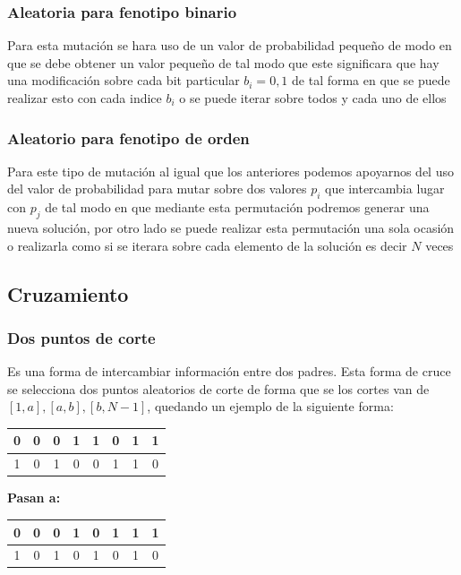 \documentclass[10pt]{article}
\begin{document}
\subsubsection{Aleatoria para fenotipo binario}
Para esta mutación se hara uso de un valor de probabilidad pequeño de modo en que se debe obtener un valor pequeño de tal modo que este significara que hay una modificación sobre cada bit particular $b_{i}={0,1}$ de tal forma en que se puede realizar esto con cada indice $b_{i}$ o se puede iterar sobre todos y cada uno de ellos
\subsubsection{Aleatorio para fenotipo de orden}
Para este tipo de mutación al igual que los anteriores podemos apoyarnos del uso del valor de probabilidad para mutar sobre dos valores $p_{i}$ que intercambia lugar con $p_{j}$ de tal modo en que mediante esta permutación podremos generar una nueva solución, por otro lado se puede realizar esta permutación una sola ocasión o realizarla como si se iterara sobre cada elemento de la solución es decir $N$ veces
\subsection{Cruzamiento}
\subsubsection{Dos puntos de corte}
Es una forma de intercambiar información entre dos padres. Esta forma de cruce se selecciona dos puntos aleatorios de corte de forma que se los cortes van de $[1,a],[a,b],[b,N-1]$, quedando un ejemplo de la siguiente forma:
\begin{center}
  \begin{tabular}{|c|c|c|c|c|c|c|c|}
    \hline
    \color{green}0&\color{green}0&\color{green}0&\color{green}1&\color{blue}1&\color{blue}0&\color{green}1&\color{green}1\\
    \hline
    \color{red}1&\color{red}0&\color{red}1&\color{red}0&\color{yellow}0&\color{yellow}1&\color{red}1&\color{red}0\\
    \hline
  \end{tabular}
  \textbf{Pasan a:}
  \begin{tabular}{|c|c|c|c|c|c|c|c|}
    \hline
    \color{green}0&\color{green}0&\color{green}0&\color{green}1&\color{yellow}0&\color{yellow}1&\color{green}1&\color{green}1\\
    \hline
    \color{red}1&\color{red}0&\color{red}1&\color{red}0&\color{blue}1&\color{blue}0&\color{red}1&\color{red}0\\
    \hline
  \end{tabular}
\end{center}
\end{document}
